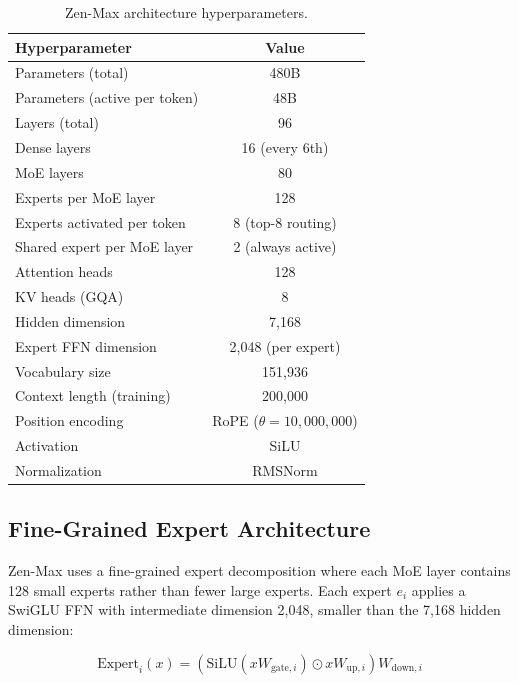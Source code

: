 \documentclass[11pt,a4paper]{article}
\begin{document}
\begin{table}[H]
\centering
\caption{Zen-Max architecture hyperparameters.}
\label{tab:arch}
\begin{tabular}{lc}
\toprule
\textbf{Hyperparameter} & \textbf{Value} \\
\midrule
Parameters (total)               & 480B \\
Parameters (active per token)    & 48B \\
Layers (total)                   & 96 \\
Dense layers                     & 16 (every 6th) \\
MoE layers                       & 80 \\
Experts per MoE layer            & 128 \\
Experts activated per token      & 8 (top-8 routing) \\
Shared expert per MoE layer      & 2 (always active) \\
Attention heads                  & 128 \\
KV heads (GQA)                   & 8 \\
Hidden dimension                 & 7{,}168 \\
Expert FFN dimension             & 2{,}048 (per expert) \\
Vocabulary size                  & 151{,}936 \\
Context length (training)        & 200{,}000 \\
Position encoding                & RoPE ($\theta = 10{,}000{,}000$) \\
Activation                       & SiLU \\
Normalization                    & RMSNorm \\
\bottomrule
\end{tabular}
\end{table}

\subsection{Fine-Grained Expert Architecture}

Zen-Max uses a fine-grained expert decomposition where each MoE layer contains 128 small
experts rather than fewer large experts. Each expert $e_i$ applies a SwiGLU FFN with
intermediate dimension 2,048, smaller than the 7,168 hidden dimension:

\begin{equation}
  \text{Expert}_i(x) = \left(\text{SiLU}(xW_{\text{gate},i}) \odot xW_{\text{up},i}\right) W_{\text{down},i}
\end{equation}
\end{document}
